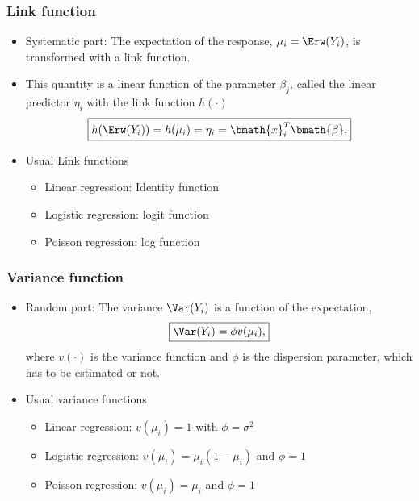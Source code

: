 \documentclass[extsize,handout,10pt]{beamer}\usepackage[]{graphicx}\usepackage[]{color}
\begin{document}
\begin{frame}
  \frametitle{Link function}
  \begin{itemize}
  \item \alert{Systematic part:} The expectation of the response,
    $\mu_i=\Erw(Y_i)$, is transformed with a \alert{link function}.
  \item This quantity is a linear function of the parameter $\beta_j$,
    called the \alert{linear predictor} $\eta_i$ with the link function
    $h(\cdot)$
    \begin{equation}
      \label{eq:55}
      \boxed{h(\Erw(Y_i))=h(\mu_i)=\eta_i=\bmath{x}^T_i\bmath{\beta}.}
    \end{equation}
  \end{itemize}
\begin{itemize}
\item Usual Link functions
\begin{itemize}
  \item Linear regression: Identity function
  \item Logistic regression: logit function
  \item Poisson regression: log function
  \end{itemize}
  \end{itemize}
\end{frame}



\begin{frame}
  \frametitle{Variance function}
  \begin{itemize}
  \item \alert{Random part:} The variance $\Var(Y_i)$ is a function of
    the expectation,
    \begin{equation}
      \label{eq:56}
      \boxed{\Var(Y_i)=\phi v(\mu_i),}
    \end{equation}
    where $v(\cdot)$ is the \alert{variance function} and $\phi$ is the
    \alert{dispersion parameter}, which has to be estimated or not.
  \end{itemize}
\begin{itemize}
\item Usual variance functions
\begin{itemize}
  \item Linear regression: $v(\mu_i)=1$ with $\phi=\sigma^2$
  \item Logistic regression: $v(\mu_i)=\mu_i(1-\mu_i)$ and $\phi=1$
  \item Poisson regression: $v(\mu_i)=\mu_i$ and $\phi=1$
  \end{itemize}
  \end{itemize}
\end{frame}
\end{document}
